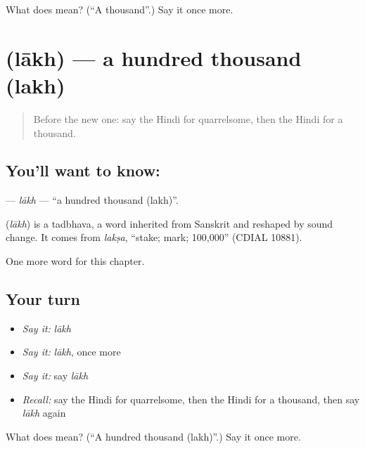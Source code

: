 \begin{tcolorbox}[breakable,colback=teal!4,colframe=teal!35!black,title={Before you move on}]
What does  mean? (\textquotedblleft{}A thousand\textquotedblright{}.) Say it once more.
\end{tcolorbox}
\section[\texorpdfstring{\hi{लाख} (lākh)}{लाख (lākh)}]{ (lākh) — a hundred thousand (lakh)}

\label{lesson:HI-C244-lakh}



\begin{quote}
Before the new one: say the Hindi for quarrelsome, then the Hindi for a thousand.
\end{quote}

\subsection*{You'll want to know: }
\textbf{} — \emph{lākh} — \textquotedblleft{}a hundred thousand (lakh)\textquotedblright{}.

\begin{cousinweb}
\textbf{} (\emph{lākh}) is a tadbhava, a word inherited from Sanskrit and reshaped by sound change. It comes from \emph{lakṣa}, \textquotedblleft{}stake; mark; 100,000\textquotedblright{} (CDIAL 10881).
\end{cousinweb}

\begin{grammarlens}[title={What you've built}]
One more word for this chapter.
\end{grammarlens}

\subsection*{Your turn}
\begin{itemize}
\raggedright
  \item \emph{Say it:} \emph{lākh}
  \item \emph{Say it:} \emph{lākh}, once more
  \item \emph{Say it:} say \emph{lākh}
  \item \emph{Recall:} say the Hindi for quarrelsome, then the Hindi for a thousand, then say \emph{lākh} again
\end{itemize}

\begin{tcolorbox}[breakable,colback=teal!4,colframe=teal!35!black,title={Before you move on}]
What does  mean? (\textquotedblleft{}A hundred thousand (lakh)\textquotedblright{}.) Say it once more.
\end{tcolorbox}

